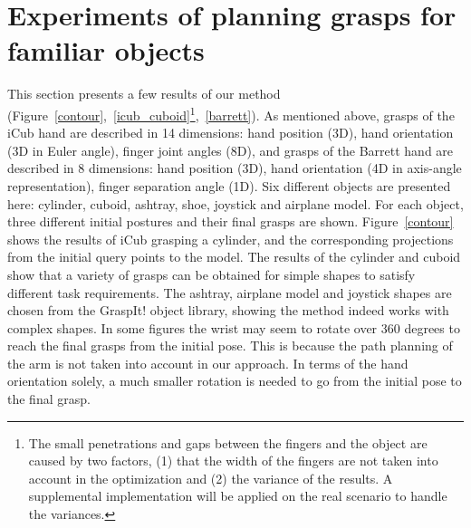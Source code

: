 \section{Experiments of planning grasps for familiar objects}
\label{cha3:sec3}

This section presents a few results of our method (Figure~\ref{contour},~\ref{icub_cuboid}\footnote{The small penetrations and gaps between the fingers and the object are caused by two factors, (1) that the width of the fingers are not taken into account in the optimization and (2) the variance of the results. A supplemental implementation will be applied on the real scenario to handle the variances.},~\ref{barrett}). As mentioned above, grasps of the iCub hand are described in 14 dimensions: hand position (3D), hand orientation (3D in Euler angle), finger joint angles (8D), and grasps of the Barrett hand are described in 8 dimensions: hand position (3D), hand orientation (4D in axis-angle representation), finger separation angle (1D). Six different objects are presented here: cylinder, cuboid, ashtray, shoe, joystick and airplane model. For each object, three different initial postures and their final grasps are shown. Figure~\ref{contour} shows the results of iCub grasping a cylinder, and the corresponding projections from the initial query points to the model. The results of the cylinder and cuboid show that a variety of grasps can be obtained for simple shapes to satisfy different task requirements. The ashtray, airplane model and joystick shapes are chosen from the GraspIt! object library, showing the method indeed works with complex shapes. In some figures the wrist may seem to rotate over 360 degrees to reach the final grasps from the initial pose. This is because the path planning of the arm is not taken into account in our approach. In terms of the hand orientation solely, a much smaller rotation is needed to go from the initial pose to the final grasp.

